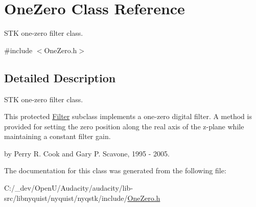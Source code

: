 \hypertarget{class_one_zero}{}\section{One\+Zero Class Reference}
\label{class_one_zero}


S\+TK one-\/zero filter class.  




{\ttfamily \#include $<$One\+Zero.\+h$>$}



\subsection{Detailed Description}
S\+TK one-\/zero filter class. 

This protected \hyperlink{class_filter}{Filter} subclass implements a one-\/zero digital filter. A method is provided for setting the zero position along the real axis of the z-\/plane while maintaining a constant filter gain.

by Perry R. Cook and Gary P. Scavone, 1995 -\/ 2005. 

The documentation for this class was generated from the following file\+:\begin{DoxyCompactItemize}
\item 
C\+:/\+\_\+dev/\+Open\+U/\+Audacity/audacity/lib-\/src/libnyquist/nyquist/nyqstk/include/\hyperlink{_one_zero_8h}{One\+Zero.\+h}\end{DoxyCompactItemize}
